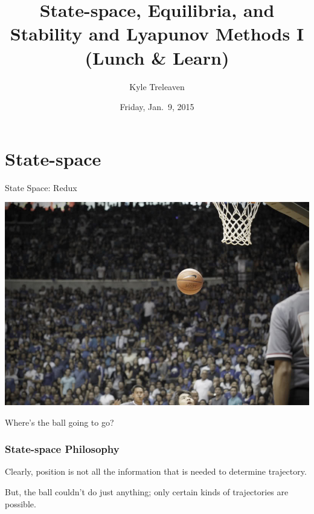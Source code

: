 \documentclass[12pt]{beamer}
\author{Kyle Treleaven}
\title{
State-space, Equilibria, and Stability and Lyapunov Methods I \\
(Lunch \& Learn)
}
\date{Friday, Jan.~9, 2015}
\begin{document}
\begin{frame}
\titlepage

\end{frame}





\section{State-space}


\begin{frame}
\vfill
\centering
{\Large State Space: Redux}
\vfill\null
\end{frame}


\begin{frame}
\centering
\vfill
\includegraphics[width=.6\linewidth]{pic/airball.jpg}

Where's the ball going to go?
\vfill\null
\end{frame}





\begin{frame}
\frametitle{State-space Philosophy}

\begin{itemize}

\vitem Clearly, position is not all the information that is needed to determine trajectory.

\vitem But, the ball couldn't do just anything; only certain kinds of trajectories are possible.

\end{itemize}

\vfill\null
\end{frame}
\end{document}
